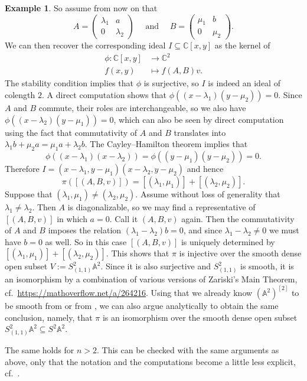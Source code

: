 \documentclass[12pt,a4paper]{amsart}
\theoremstyle{plain}
\theoremstyle{definition}
\newtheorem{exmp}[thm]{Example}
\theoremstyle{remark}
\begin{document}
\begin{exmp}
  So assume from now on that
  \[ A = \begin{pmatrix} \lambda_{1} & a \\
  0 & \lambda_{2} \end{pmatrix}
  \quad \text{ and } \quad B = \begin{pmatrix}
    \mu_{1} & b \\
    0 & \mu_{2} \end{pmatrix}.
  \]
  We can then recover the corresponding ideal $I \subseteq \mathbb{C}[x,y]$ as the kernel of
  \begin{align*}
    \phi \colon \mathbb{C}[x,y] & \longrightarrow \mathbb{C}^{2} \\
    f(x,y) & \longmapsto f(A,B)v.
  \end{align*}
  The stability condition implies that $\phi$ is surjective, so $I$ is indeed an ideal of colength $2$.
  A direct computation shows that $\phi((x-\lambda_{1})(y - \mu_{2}))= 0$.
  Since $A$ and $B$ commute, their roles are interchangeable, so we also have $\phi((x - \lambda_{2})(y - \mu_{1})) = 0$, which can also be seen by direct computation using the fact that commutativity of $A$ and $B$ translates into $\lambda_{1} b + \mu_{2} a = \mu_{1} a + \lambda_{2} b$.
  The Cayley--Hamilton theorem implies that
  \[ \phi((x - \lambda_{1})(x - \lambda_{2})) = \phi((y - \mu_{1})(y - \mu_{2})) = 0. \]
  Therefore $I = (x - \lambda_{1}, y - \mu_{1})(x - \lambda_{2}, y - \mu_{2})$ and hence
  \[ \pi([(A,B,v)]) = [(\lambda_{1}, \mu_{1})] + [(\lambda_{2}, \mu_{2})]. \]
  Suppose that $(\lambda_{1}, \mu_{1}) \neq (\lambda_{2}, \mu_{2})$.
  Assume without loss of generality that $\lambda_{1} \neq \lambda_{2}$.
  Then $A$ is diagonalizable, so we may find a representative of $[(A,B,v)]$ in which $a = 0$.
  Call it $(A,B,v)$ again.
  Then the commutativity of $A$ and $B$ imposes the relation $(\lambda_{1}-\lambda_{2})b = 0$, and since $\lambda_{1} - \lambda_{2} \neq 0$ we must have $b = 0$ as well.
  So in this case $[(A,B,v)]$ is uniquely determined by $[(\lambda_{1},\mu_{1})] + [(\lambda_{2}, \mu_{2})]$.
  This shows that $\pi$ is injective over the smooth dense open subset $V := S^{2}_{(1,1)}\mathbb{A}^{2}$.
  Since it is also surjective and $S^{2}_{(1,1)}$ is smooth, it is an isomorphism by a combination of various versions of Zariski's Main Theorem, cf.~\url{https://mathoverflow.net/a/264216}.
  Using that we already know $(\mathbb{A}^{2})^{[2]}$ to be smooth from \cite[Theorem 18.7]{ms05} or from \cite[Theorem 1.9]{nak99}, we can also argue analytically to obtain the same conclusion, namely, that $\pi$ is an isomorphism over the smooth dense open subset $S^{2}_{(1,1)}\mathbb{A}^{2} \subseteq S^{2}\mathbb{A}^{2}$.

  The same holds for $n > 2$.
  This can be checked with the same arguments as above, only that the notation and the computations become a little less explicit, cf.~\cite[Example 1.12.(4)]{nak99}.
\end{exmp}
\end{document}

